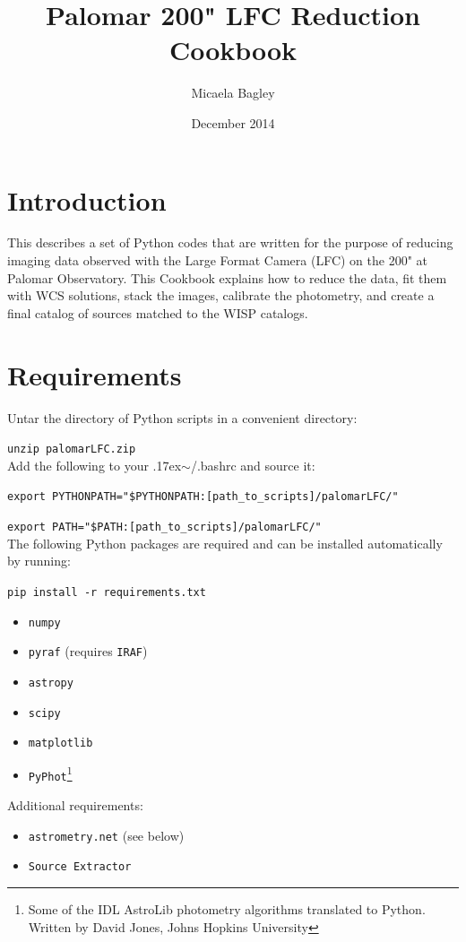 \documentclass{article}
\title{Palomar 200" LFC Reduction Cookbook}
\author{Micaela Bagley}
\date{December 2014}
\newlength{\wideitemsep}
\let\olditem\item
\renewcommand{\item}{\setlength{\itemsep}{\wideitemsep}\olditem}
\newcommand{\ttsim}{\raise.17ex\hbox{$\scriptstyle\mathtt{\sim}$}}
\begin{document}
\maketitle

\section{Introduction}
This describes a set of Python codes that are written for the purpose 
of reducing imaging data observed with the Large Format Camera (LFC) on the 
200" at Palomar Observatory. This Cookbook explains how to reduce the data,
fit them with WCS solutions, stack the images, calibrate the photometry,
and create a final catalog of sources matched to the WISP catalogs.

\vspace{4 mm}
\section{Requirements}
Untar the directory of Python scripts in a convenient directory: 

\texttt{unzip palomarLFC.zip} \\
Add the following to your \ttsim/.bashrc and source it:

\texttt{export PYTHONPATH="\$PYTHONPATH:[path\_to\_scripts]/palomarLFC/"}

\texttt{export PATH="\$PATH:[path\_to\_scripts]/palomarLFC/"}\\

\noindent The following Python packages are required and can be installed 
automatically by running:

\texttt{pip install -r requirements.txt}
\begin{itemize}
\item \texttt{numpy}
\item \texttt{pyraf} (requires \texttt{IRAF})
\item \texttt{astropy}
\item \texttt{scipy}
\item \texttt{matplotlib}
\item \texttt{PyPhot}\footnote{Some of the IDL AstroLib photometry algorithms translated to Python. Written by David Jones, Johns Hopkins University}
\end{itemize}

\noindent Additional requirements:
\begin{itemize}
\item \texttt{astrometry.net} (see below)
\item \texttt{Source Extractor}
\end{itemize}
\end{document}
